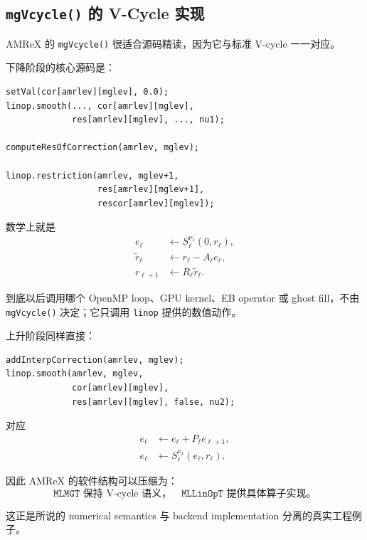 \subsection{\texttt{mgVcycle()} 的 V-Cycle 实现}

AMReX 的 \texttt{mgVcycle()} 很适合源码精读，因为它与标准 V-cycle 一一对应。

下降阶段的核心源码是：

\begin{verbatim}
setVal(cor[amrlev][mglev], 0.0);
linop.smooth(..., cor[amrlev][mglev],
             res[amrlev][mglev], ..., nu1);

computeResOfCorrection(amrlev, mglev);

linop.restriction(amrlev, mglev+1,
                  res[amrlev][mglev+1],
                  rescor[amrlev][mglev]);
\end{verbatim}

数学上就是
\begin{align}
e_\ell &\leftarrow S_\ell^{\nu_1}(0,r_\ell),\\
\tilde r_\ell &\leftarrow r_\ell-A_\ell e_\ell,\\
r_{\ell+1} &\leftarrow R_\ell\tilde r_\ell.
\end{align}

到底以后调用哪个 OpenMP loop、GPU kernel、EB operator 或 ghost fill，不由 \texttt{mgVcycle()} 决定；它只调用 \texttt{linop} 提供的数值动作。

上升阶段同样直接：

\begin{verbatim}
addInterpCorrection(amrlev, mglev);
linop.smooth(amrlev, mglev,
             cor[amrlev][mglev],
             res[amrlev][mglev], false, nu2);
\end{verbatim}

对应
\begin{align}
e_\ell &\leftarrow e_\ell + P_\ell e_{\ell+1},\\
e_\ell &\leftarrow S_\ell^{\nu_2}(e_\ell,r_\ell).
\end{align}

因此 AMReX 的软件结构可以压缩为：
\begin{equation}
\boxed{
\texttt{MLMGT}
\text{ 保持 V-cycle 语义，}
\quad
\texttt{MLLinOpT}
\text{ 提供具体算子实现。}
}
\label{eq:software-amrex-driver-operator}
\end{equation}

这正是所说的 numerical semantics 与 backend implementation 分离的真实工程例子。

